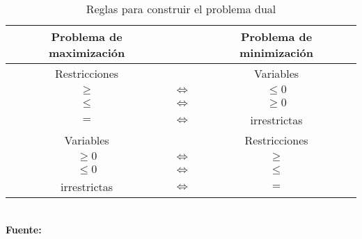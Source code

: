 \begin{table}[H]
\begin{center}
\caption{Reglas para construir el problema dual}
\begin{small}
\begin{tabular}{ccc}
\hline
Problema de maximización &                   & Problema de minimización \\ \hline
Restricciones            &                   & Variables                \\ \hline
$\geq$                   & $\Leftrightarrow$ &  $\leq 0$                \\
$\leq$                   & $\Leftrightarrow$ &  $\geq 0$                \\
$=$                      & $\Leftrightarrow$ &  irrestrictas            \\ \hline
Variables                &                   & Restricciones            \\ \hline
$\geq 0$                 & $\Leftrightarrow$ & $\geq$                   \\
$\leq 0$                 & $\Leftrightarrow$ & $\leq$                   \\
irrestrictas             & $\Leftrightarrow$ & $=$                      \\ \hline
\end{tabular}
\end{small}\\
\textbf{Fuente:} \cite{Taha:1998}
\label{tabla:3}
\end{center}
\end{table}
